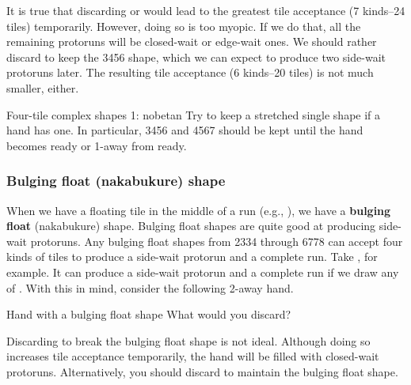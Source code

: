 \bigskip 
\noindent
It is true that discarding {\LARGE{}} or {\LARGE{}} would lead to the greatest tile acceptance (7 kinds--24 tiles) temporarily. However, doing so is too myopic. If we do that, all the remaining protoruns will be closed-wait or edge-wait ones. We should rather discard {\LARGE{}} to keep the 3456 shape, which we can expect to produce two side-wait protoruns later. The resulting tile acceptance (6 kinds--20 tiles) is not much smaller, either. 

\bigskip

\color{MyRed}
\begin{itembox}[c]{Four-tile complex shapes 1: {\jap nobetan}}
\normalcolor
Try to keep a stretched single shape if a hand has one. In particular, 3456 and 4567 should be kept until the hand becomes ready or 1-away from ready. 
\end{itembox}
\normalcolor

\bigskip


\subsubsection{Bulging float ({\jap nakabukure}) shape}

When we have a floating tile in the middle of a run (e.g., {\LARGE{}}), we have a {\bf bulging float} ({\jap nakabukure}) shape. 
Bulging float shapes are quite good at producing side-wait protoruns. Any bulging float shapes from 2334 through 6778 can accept four kinds of tiles to produce a side-wait protorun and a complete run. Take {\LARGE{}}, for example. It can produce a side-wait protorun and a complete run if we draw any of {\LARGE{}}. 
With this in mind, consider the following 2-away hand.
\bigskip
\begin{itembox}[r]{Hand with a bulging float shape}
\bp
{}
\ep
\vspace{-10pt}What would you discard? \vspace{-5pt}
\end{itembox}
Discarding {\LARGE{}} to break the bulging float shape is not ideal. Although doing so increases tile acceptance temporarily, the hand will be filled with closed-wait protoruns. Alternatively, you should discard {\LARGE{}} to maintain the bulging float shape. 


